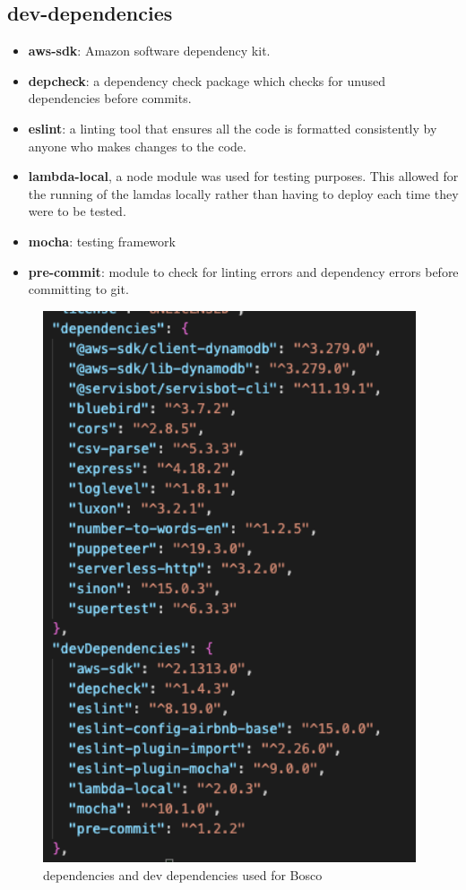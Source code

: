 \documentclass[12pt,a4paper,titlepage]{report}
\begin{document}
\subsection*{dev-dependencies}
\begin{itemize}
  \item \textbf{aws-sdk}: Amazon software dependency kit.
  \item \textbf{depcheck}: a dependency check package which checks for unused dependencies before commits.
  \item \textbf{eslint}: a linting tool that ensures all the code is formatted consistently by anyone who makes changes to the code.
  \item \textbf{lambda-local}, a node module was used for testing purposes. This allowed for the running of the lamdas locally rather than having 
to deploy each time they were to be tested. 
  \item \textbf{mocha}: testing framework
  \item \textbf{pre-commit}: module to check for linting errors and dependency errors before committing to git.
\end{itemize}

\begin{figure}[H]
  \centering
  \includegraphics[width=11cm]{./diagrams/dependencies.png}
  \caption{dependencies and dev dependencies used for Bosco}
 \end{figure}
\end{document}
